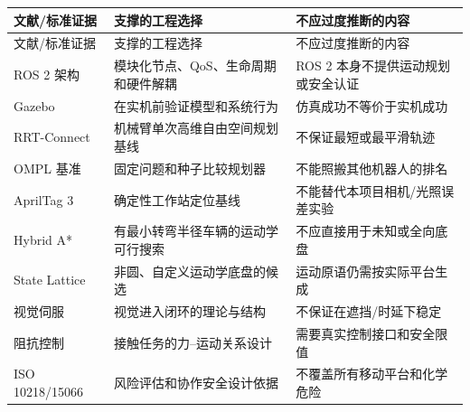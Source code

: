 \documentclass[UTF8,12pt,oneside]{ctexrep}
\begin{document}
\begin{longtable}{L{4.2cm}L{4.8cm}L{5.6cm}}
\toprule
文献/标准证据 & 支撑的工程选择 & 不应过度推断的内容 \\
\midrule
\endfirsthead
\toprule
文献/标准证据 & 支撑的工程选择 & 不应过度推断的内容 \\
\midrule
\endhead
ROS 2 架构\cite{macenski2022ros2} & 模块化节点、QoS、生命周期和硬件解耦 & ROS 2 本身不提供运动规划或安全认证 \\
Gazebo\cite{koenig2004gazebo} & 在实机前验证模型和系统行为 & 仿真成功不等价于实机成功 \\
RRT-Connect\cite{kuffner2000rrtconnect} & 机械臂单次高维自由空间规划基线 & 不保证最短或最平滑轨迹 \\
OMPL 基准\cite{moll2015benchmarking} & 固定问题和种子比较规划器 & 不能照搬其他机器人的排名 \\
AprilTag 3\cite{krogius2019apriltag3} & 确定性工作站定位基线 & 不能替代本项目相机/光照误差实验 \\
Hybrid A*\cite{dolgov2008hybridastar} & 有最小转弯半径车辆的运动学可行搜索 & 不应直接用于未知或全向底盘 \\
State Lattice\cite{pivtoraiko2009lattice} & 非圆、自定义运动学底盘的候选 & 运动原语仍需按实际平台生成 \\
视觉伺服\cite{chaumette2006visualservo} & 视觉进入闭环的理论与结构 & 不保证在遮挡/时延下稳定 \\
阻抗控制\cite{hogan1985impedance} & 接触任务的力--运动关系设计 & 需要真实控制接口和安全限值 \\
ISO 10218/15066\cite{iso10218_1_2025,iso15066_2016} & 风险评估和协作安全设计依据 & 不覆盖所有移动平台和化学危险 \\
\bottomrule
\end{longtable}

\printbibliography[heading=bibintoc,title={参考文献}]
\end{document}
